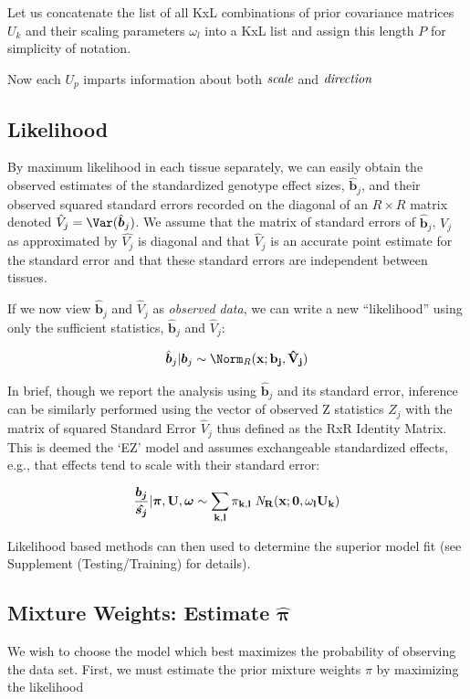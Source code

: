 \begin{enumerate}
Let us concatenate the list of all KxL combinations of prior covariance matrices $U_{k}$ and their scaling parameters $\omega_{l}$ into a KxL list and assign this length $P$ for simplicity of notation.

Now each $U_{p}$ imparts information about both $\emph{scale}$ and $\emph{direction}$


\subsection{Likelihood}

By maximum likelihood in each tissue separately, we can easily obtain the observed estimates of the standardized genotype effect sizes, $\hat{\bm{b}}_{j}$, and their observed squared standard errors recorded on the diagonal of an $R \times R$ matrix denoted $\hat{V}_{j} = \Var(\hat{\bm{b}}_{j})$. 
We assume that the matrix of standard errors of $\hat{\bm{b}}_{j}$, $V_{j}$ as approximated by $\hat{V_{j}}$ is diagonal and  that $\hat{V}_{j}$ is an accurate point estimate for the standard error and that these standard errors are independent between tissues.

If we now view $\hat{\bm{b}}_{j}$ and $\hat{V}_{j}$ as \emph{observed data}, we can write a new ``likelihood'' using only the sufficient statistics,   $\hat{\bm{b}}_{j}$ and $\hat{V}_{j}$:

\begin{equation}
\hat{\bm{b}}_{j} | \bm{b}_{j} \sim \Norm_R(\bf{x}; \bm{b}_{j}, \hat{V}_{j})
    \label{eqn:new_lik}
\end{equation}

In brief, though we report the analysis using $\hat{\bm{b}}_{j}$ and its standard error, inference can be similarly performed using the vector of observed Z statistics ${Z}_{j}$ with the matrix of squared Standard Error $\hat{V}_{j}$ thus defined as the RxR Identity Matrix. This is deemed the `EZ' model and assumes exchangeable standardized effects, e.g., that effects tend to scale with their standard error:

 \begin{equation}
  \frac{\bm{b_{j}}}{\bm{\hat{s_{j}}}} | \bm{\pi},\bf{U}, \bm{\omega} \sim \sum_{k,l} \pi_{k,l} \;{\it N}_R(x; \bm{0}, \omega_l U_{k})
\end{equation}

Likelihood based methods can then used to determine the superior model fit (see Supplement (Testing/Training) for details).

\subsection{Mixture Weights: Estimate $\hat{\bm{\pi}}$}\label{sssec:ebweights}
We wish to choose the model which best maximizes the probability of observing the data set. First, we must estimate the prior mixture weights $\pi$ by maximizing the likelihood 


\end{enumerate}
